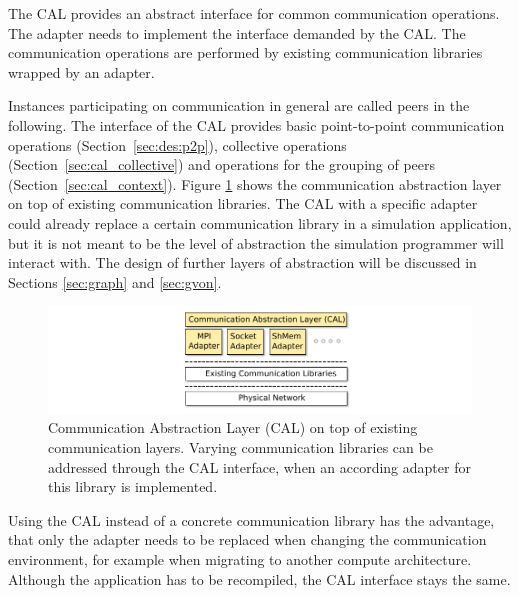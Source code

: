 The CAL provides an abstract interface for common communication
operations. The adapter needs to implement the interface demanded by
the CAL.  The communication operations are performed by existing
communication libraries wrapped by an adapter.

Instances participating on communication in general are called peers
in the following.  The interface of the CAL provides basic
point-to-point communication operations (Section~\ref{sec:des:p2p}),
collective operations (Section~\ref{sec:cal_collective}) and
operations for the grouping of peers (Section~\ref{sec:cal_context}).
Figure \ref{fig:cal} shows the communication abstraction layer on top
of existing communication libraries.  The CAL with a specific adapter
could already replace a certain communication library in a simulation
application, but it is not meant to be the level of abstraction the
simulation programmer will interact with. The design of further layers
of abstraction will be discussed in Sections \ref{sec:graph} and
\ref{sec:gvon}.

\begin{figure}[H]
  \centering
  \includegraphics[width=\textwidth]{graphics/30_design_cal}
  \caption{Communication Abstraction Layer (CAL) on top of existing
    communication layers. Varying communication libraries can be
    addressed through the CAL interface, when an according adapter for
    this library is implemented.}
  \label{fig:cal}
\end{figure}


\noindent Using the CAL instead of a concrete communication library has
the advantage, that only the adapter needs to be replaced when
changing the communication environment, for example when migrating
to another compute architecture. Although the application has
to be recompiled, the CAL interface stays the same.




